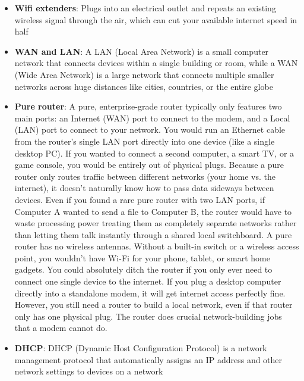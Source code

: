 \documentclass{report}
\begin{document}
\begin{itemize}
            \bigbreak \noindent 
            Access points focus purely on distributing a wireless signal. They do not manage traffic routing or provide firewall protection on their own; they rely on a connected router to handle those duties
        \item \textbf{Wifi extenders}: Plugs into an electrical outlet and repeats an existing wireless signal through the air, which can cut your available internet speed in half
        \item \textbf{WAN and LAN}: A LAN (Local Area Network) is a small computer network that connects devices within a single building or room, while a WAN (Wide Area Network) is a large network that connects multiple smaller networks across huge distances like cities, countries, or the entire globe
        \item \textbf{Pure router}:  A pure, enterprise-grade router typically only features two main ports: an Internet (WAN) port to connect to the modem, and a Local (LAN) port to connect to your network.
            \bigbreak \noindent 
            You would run an Ethernet cable from the router’s single LAN port directly into one device (like a single desktop PC). If you wanted to connect a second computer, a smart TV, or a game console, you would be entirely out of physical plugs.
            \bigbreak \noindent 
            Because a pure router only routes traffic between different networks (your home vs. the internet), it doesn't naturally know how to pass data sideways between devices. Even if you found a rare pure router with two LAN ports, if Computer A wanted to send a file to Computer B, the router would have to waste processing power treating them as completely separate networks rather than letting them talk instantly through a shared local switchboard.
            \bigbreak \noindent 
            A pure router has no wireless antennas. Without a built-in switch or a wireless access point, you wouldn't have Wi-Fi for your phone, tablet, or smart home gadgets.
            \bigbreak \noindent 
            You could absolutely ditch the router if you only ever need to connect one single device to the internet. If you plug a desktop computer directly into a standalone modem, it will get internet access perfectly fine.
            \bigbreak \noindent 
            However, you still need a router to build a local network, even if that router only has one physical plug. The router does crucial network-building jobs that a modem cannot do.
        \item \textbf{DHCP}: DHCP (Dynamic Host Configuration Protocol) is a network management protocol that automatically assigns an IP address and other network settings to devices on a network

\end{itemize}
\end{document}

